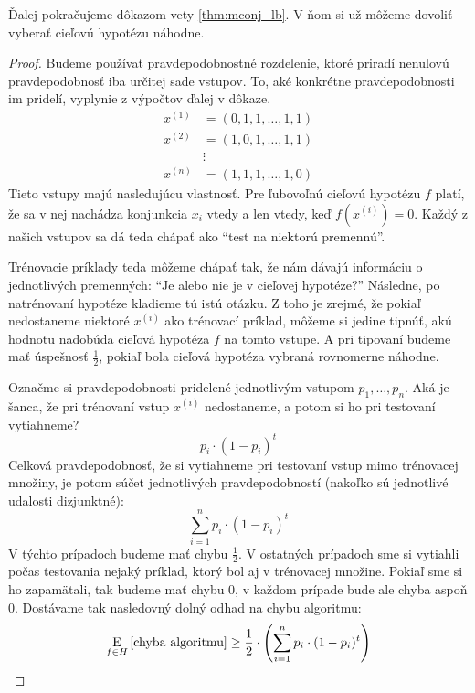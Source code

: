 Ďalej pokračujeme dôkazom vety \ref{thm:mconj_lb}. V ňom si už môžeme
dovoliť vyberať cieľovú hypotézu náhodne.

\begin{proof}
  Budeme používať pravdepodobnostné rozdelenie, ktoré priradí nenulovú
  pravdepodobnosť iba určitej sade vstupov. To, aké konkrétne
  pravdepodobnosti im pridelí, vyplynie z výpočtov ďalej v dôkaze.
  \begin{align}
    x^{(1)} &= (0, 1, 1, \ldots, 1, 1) \\
    x^{(2)} &= (1, 0, 1, \ldots, 1, 1) \\
            &\vdots \\
    x^{(n)} &= (1, 1, 1, \ldots, 1, 0)
  \end{align}
  Tieto vstupy majú nasledujúcu vlastnosť. Pre ľubovoľnú cieľovú hypotézu
  $f$ platí, že sa v nej nachádza konjunkcia $x_i$ vtedy a len vtedy, keď
  $f(x^{(i)}) = 0$. Každý z našich vstupov sa dá teda chápať ako
  ``test na niektorú premennú''.
  
  Trénovacie príklady teda môžeme chápať tak, že nám dávajú informáciu
  o jednotlivých premenných: ``Je alebo nie je v cieľovej hypotéze?''
  Následne, po natrénovaní hypotéze kladieme tú istú otázku. Z toho je
  zrejmé, že pokiaľ nedostaneme niektoré $x^{(i)}$ ako trénovací príklad,
  môžeme si jedine tipnúť, akú hodnotu nadobúda cieľová hypotéza $f$
  na tomto vstupe. A pri tipovaní budeme mať úspešnosť $\frac{1}{2}$,
  pokiaľ bola cieľová hypotéza vybraná rovnomerne náhodne.
  
  Označme si pravdepodobnosti pridelené jednotlivým vstupom $p_1, \ldots, p_n$.
  Aká je šanca, že pri trénovaní vstup $x^{(i)}$ nedostaneme, a potom si ho
  pri testovaní vytiahneme?
  $$p_i \cdot (1 - p_i)^t$$
  Celková pravdepodobnosť, že si vytiahneme pri testovaní vstup mimo
  trénovacej množiny, je potom súčet jednotlivých pravdepodobností
  (nakoľko sú jednotlivé udalosti dizjunktné):
  $$\sum_{i=1}^n p_i \cdot (1 - p_i)^t$$
  V týchto prípadoch budeme mať chybu $\frac{1}{2}$. V ostatných
  prípadoch sme si vytiahli počas testovania nejaký príklad, ktorý
  bol aj v trénovacej množine. Pokiaľ sme si ho zapamätali, tak budeme
  mať chybu $0$, v každom prípade bude ale chyba aspoň $0$. Dostávame
  tak nasledovný dolný odhad na chybu algoritmu:
  $$ \operatorname*{\mathrm{E}}_{f \in H} \left[ \text{\normalfont chyba algoritmu} \right] \geq \frac{1}{2} \cdot \left( \sum_{i=1}^n p_i \cdot (1 - p_i)^t \right) $$
  

\end{proof}

